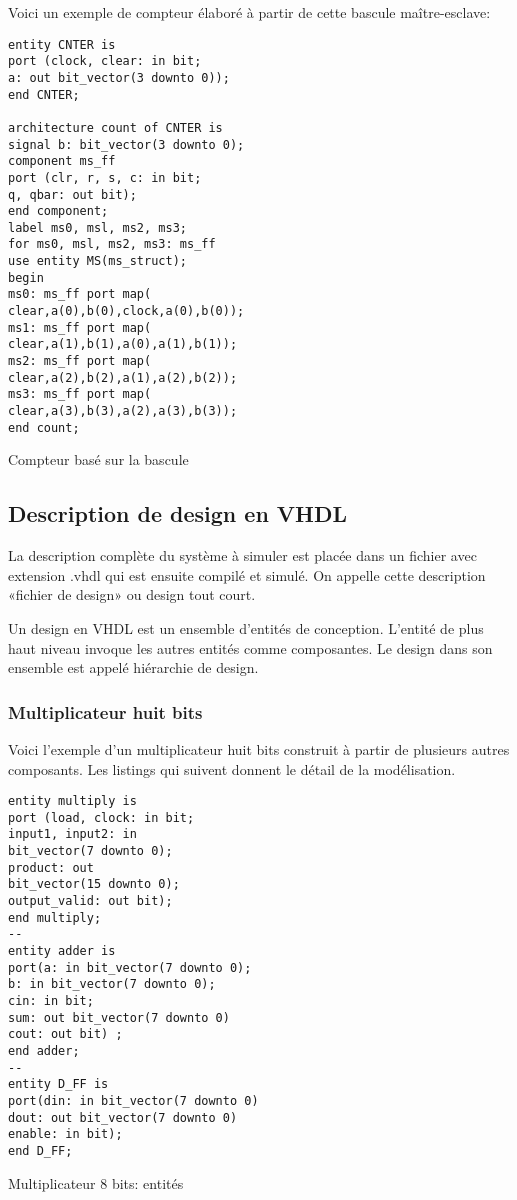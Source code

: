 \documentclass[11pt]{article}
\begin{document}
Voici un exemple de compteur élaboré à partir de cette bascule maître-esclave:

\begin{listing}[htbp]
\begin{verbatim}
entity CNTER is
port (clock, clear: in bit;
a: out bit_vector(3 downto 0));
end CNTER;

architecture count of CNTER is
signal b: bit_vector(3 downto 0);
component ms_ff
port (clr, r, s, c: in bit;
q, qbar: out bit);
end component;
label ms0, msl, ms2, ms3;
for ms0, msl, ms2, ms3: ms_ff
use entity MS(ms_struct);
begin
ms0: ms_ff port map(
clear,a(0),b(0),clock,a(0),b(0));
ms1: ms_ff port map(
clear,a(1),b(1),a(0),a(1),b(1));
ms2: ms_ff port map(
clear,a(2),b(2),a(1),a(2),b(2));
ms3: ms_ff port map(
clear,a(3),b(3),a(2),a(3),b(3));
end count;
\end{verbatim}
\caption{Compteur basé sur la bascule}
\end{listing}


\subsection{Description de design en VHDL}
\label{sec:org485d2d3}

La description complète du système à simuler est placée dans un
fichier avec extension .vhdl qui est ensuite compilé et simulé.  On
appelle cette description «fichier de design» ou design tout court.

Un design en VHDL est un ensemble d'entités de conception. L'entité de
plus haut niveau invoque les autres entités comme composantes. Le design
dans son ensemble est appelé hiérarchie de design.

\subsubsection{Multiplicateur huit bits}
\label{sec:org5959329}

Voici l'exemple d'un multiplicateur huit bits construit à partir de
plusieurs autres composants.  Les listings qui suivent donnent le
détail de la modélisation.

\begin{listing}[htbp]
\begin{verbatim}
entity multiply is
port (load, clock: in bit;
input1, input2: in
bit_vector(7 downto 0);
product: out
bit_vector(15 downto 0);
output_valid: out bit);
end multiply;
--
entity adder is
port(a: in bit_vector(7 downto 0);
b: in bit_vector(7 downto 0);
cin: in bit;
sum: out bit_vector(7 downto 0)
cout: out bit) ;
end adder;
--
entity D_FF is
port(din: in bit_vector(7 downto 0)
dout: out bit_vector(7 downto 0)
enable: in bit);
end D_FF;
\end{verbatim}
\caption{Multiplicateur 8 bits: entités}
\end{listing}
\end{document}
